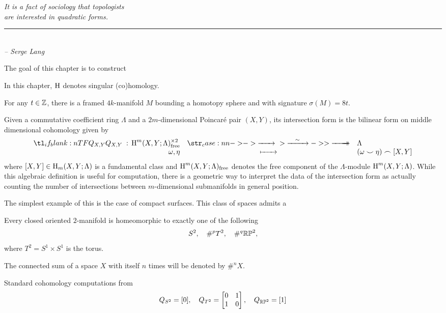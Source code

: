 \begin{flushleft}
	\textsl{It is a fact of sociology that topologists}\\
	\textsl{are interested in quadratic forms.}\\
	\rule[0pt]{17em}{0.5pt}\\
	\textsl{-- Serge Lang}
	\vspace{2em}
\end{flushleft}

The goal of this chapter is to construct

\begin{convention*}
	In this chapter, $\operatorname{H}$ denotes singular (co)homology.
\end{convention*}

\begin{theorem}\label{thm:signature_8_existence_theorem}
	For any $t\in \mathbb{Z}$, there is a framed $4k$-manifold $M$ bounding a homotopy sphere and with signature $\sigma(M)=8t$.
\end{theorem}

Given a commutative coefficient ring $\Lambda$ and a $2m$-dimensional Poincar\'e pair $(X,Y)$, its intersection form is the bilinear form on middle dimensional cohomology
given by
\[ 
	\lkxfunc{Q_{X,Y}}{\H^m(X,Y; \Lambda)^{\times 2}_{\textrm{free}}}{\Lambda}{\omega, \eta}{(\omega\smile \eta)\frown [X,Y]}
\]
where $[X,Y]\in \operatorname{H}_m(X,Y; \Lambda)$ is a fundamental class and $\operatorname{H}^m(X,Y; \Lambda)_{\textrm{free}}$ denotes the free component of the $\Lambda$-module $\operatorname{H}^m(X,Y;\Lambda)$. While this algebraic definition is useful for computation, there is a geometric way to interpret the data of the intersection form as actually counting the number of intersections between $m$-dimensional submanifolds in general position.

The simplest example of this is the case of compact surfaces. This class of spaces admits a 
\begin{theorem}
	Every closed oriented $2$-manifold is homeomorphic to exactly one of the following 
	\[
			S^2,\quad \#^p T^2, \quad \#^q \mathbb{RP}^2,
	\]
	where $T^2=S^1\times S^1$ is the torus.
\end{theorem}

\begin{convention*}
The connected sum of a space $X$ with itself $n$ times will be denoted by $\#^n X$.
\end{convention*}

Standard cohomology computations from 
\[
  Q_{S^2} = [0], \quad Q_{T^2} = \begin{bmatrix}0&1\\ 1&0\end{bmatrix}, \quad Q_{\mathbb{RP}^2} = [1]
\]

